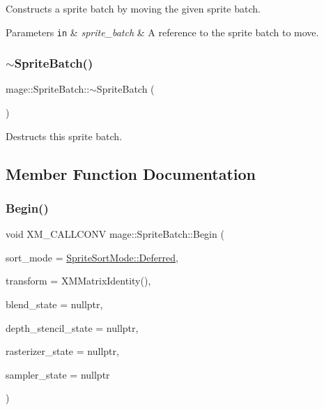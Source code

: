 Constructs a sprite batch by moving the given sprite batch.


\begin{DoxyParams}[1]{Parameters}
\mbox{\tt in}  & {\em sprite\+\_\+batch} & A reference to the sprite batch to move. \\
\hline
\end{DoxyParams}
\hypertarget{classmage_1_1_sprite_batch_a1c284e2c0ed96081f9f2fb1f84e5817f}{}\label{classmage_1_1_sprite_batch_a1c284e2c0ed96081f9f2fb1f84e5817f} 
\subsubsection{\texorpdfstring{$\sim$\+Sprite\+Batch()}{~SpriteBatch()}}
{\footnotesize\ttfamily mage\+::\+Sprite\+Batch\+::$\sim$\+Sprite\+Batch (\begin{DoxyParamCaption}{ }\end{DoxyParamCaption})\hspace{0.3cm}{\ttfamily [default]}}

Destructs this sprite batch. 

\subsection{Member Function Documentation}
\hypertarget{classmage_1_1_sprite_batch_a76458df59d4fa6fe99d4dae375bf0fc5}{}\label{classmage_1_1_sprite_batch_a76458df59d4fa6fe99d4dae375bf0fc5} 
\subsubsection{\texorpdfstring{Begin()}{Begin()}}
{\footnotesize\ttfamily void X\+M\+\_\+\+C\+A\+L\+L\+C\+O\+NV mage\+::\+Sprite\+Batch\+::\+Begin (\begin{DoxyParamCaption}\item[{\hyperlink{namespacemage_a256fa5833eecc408923de7ffadb5e014}{Sprite\+Sort\+Mode}}]{sort\+\_\+mode = {\ttfamily \hyperlink{namespacemage_a5e7e18b0154373ce8fc942fe3f6b27fda4ed71db54748b36eeb398876b0c747ac}{Sprite\+Sort\+Mode\+::\+Deferred}},  }\item[{F\+X\+M\+M\+A\+T\+R\+IX}]{transform = {\ttfamily XMMatrixIdentity()},  }\item[{I\+D3\+D11\+Blend\+State $\ast$}]{blend\+\_\+state = {\ttfamily nullptr},  }\item[{I\+D3\+D11\+Depth\+Stencil\+State $\ast$}]{depth\+\_\+stencil\+\_\+state = {\ttfamily nullptr},  }\item[{I\+D3\+D11\+Rasterizer\+State $\ast$}]{rasterizer\+\_\+state = {\ttfamily nullptr},  }\item[{I\+D3\+D11\+Sampler\+State $\ast$}]{sampler\+\_\+state = {\ttfamily nullptr} }\end{DoxyParamCaption})}

